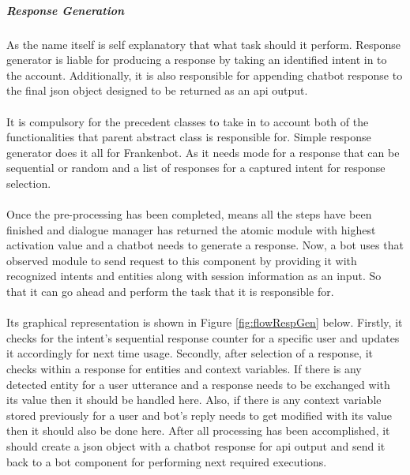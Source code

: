 \subparagraph*{Response Generation}
As the name itself is self explanatory that what task should it perform. Response generator is liable for producing a response by taking an identified intent in to the account. Additionally, it is also responsible for appending chatbot response to the final json object designed to be returned as an api output. 
\\~\\
It is compulsory for the precedent classes to take in to account both of the functionalities that parent abstract class is responsible for. Simple response generator does it all for Frankenbot. As it needs mode for a response that can be sequential or random and a list of responses for a captured intent for response selection.
\\~\\
Once the pre-processing has been completed, means all the steps have been finished and dialogue manager has returned the atomic module with highest activation value and a chatbot needs to generate a response. Now, a bot uses that observed module to send request to this component by providing it with recognized intents and entities along with session information as an input. So that it can go ahead and perform the task that it is responsible for. 
\\~\\
Its graphical representation is shown in Figure \ref{fig:flowRespGen} below. Firstly, it checks for the intent's sequential response counter for a specific user and updates it accordingly for next time usage. Secondly, after selection of a response, it checks within a response for entities and context variables. If there is any detected entity for a user utterance and a response needs to be exchanged with its value then it should be handled here. Also, if there is any context variable stored previously for a user and bot's reply needs to get modified with its value then it should also be done here. After all processing has been accomplished, it should create a json object with a chatbot response for api output and send it back to a bot component for performing next required executions. 

